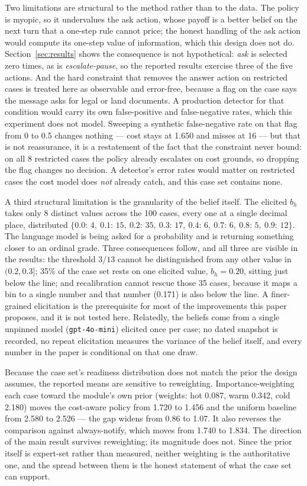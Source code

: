 \documentclass{article}
\begin{document}
Two limitations are structural to the method rather than to the data. The policy
is myopic, so it undervalues the ask action, whose payoff is a better belief on
the next turn that a one-step rule cannot price; the honest handling of the ask
action would compute its one-step value of information, which this design does not
do. Section~\ref{sec:results} shows the consequence is not hypothetical:
\emph{ask} is selected zero times, as is \emph{escalate-pause}, so the reported
results exercise three of the five actions. And the hard constraint that removes
the answer action on restricted cases is treated here as observable and
error-free, because a flag on the case says the message asks for legal or land
documents. A production detector for that condition
would carry its own false-positive and false-negative rates, which this experiment
does not model. Sweeping a synthetic false-negative rate on that flag from 0 to 0.5
changes nothing --- cost stays at 1.650 and misses at 16 --- but that is not
reassurance, it is a restatement of the fact that the constraint never bound: on all
8 restricted cases the policy already escalates on cost grounds, so dropping the flag
changes no decision. A detector's error rates would matter on restricted cases the
cost model does \emph{not} already catch, and this case set contains none.

A third structural limitation is the granularity of the belief itself. The elicited
$b_h$ takes only 8 distinct values across the 100 cases, every one at a single
decimal place, distributed $\{0.0{:}\,4,\ 0.1{:}\,15,\ 0.2{:}\,35,\ 0.3{:}\,17,\
0.4{:}\,6,\ 0.7{:}\,6,\ 0.8{:}\,5,\ 0.9{:}\,12\}$. The language model is being asked
for a probability and is returning something closer to an ordinal grade. Three
consequences follow, and all three are visible in the results: the threshold $3/13$
cannot be distinguished from any other value in $(0.2, 0.3]$; 35\% of the case set
rests on one elicited value, $b_h = 0.20$, sitting just below the line; and
recalibration cannot rescue those 35 cases, because it maps a bin to a single
number and that number (0.171) is also below the line. A finer-grained elicitation
is the prerequisite for most of the improvements this paper proposes, and it is not
tested here. Relatedly, the beliefs come from a single unpinned model
(\texttt{gpt-4o-mini}) elicited once per case; no dated snapshot is recorded, no
repeat elicitation measures the variance of the belief itself, and every number in
the paper is conditional on that one draw.

Because the case set's readiness distribution does not match the prior the design
assumes, the reported means are sensitive to reweighting. Importance-weighting each
case toward the module's own prior (weights: hot 0.087, warm 0.342, cold 2.180)
moves the cost-aware policy from 1.720 to 1.456 and the uniform baseline from 2.580
to 2.526 --- the gap widens from 0.86 to 1.07. It also reverses the comparison
against always-notify, which moves from 1.740 to 1.834. The direction of the main
result survives reweighting; its magnitude does not. Since the prior itself is
expert-set rather than measured, neither weighting is the authoritative one, and the
spread between them is the honest statement of what the case set can support.
\end{document}
